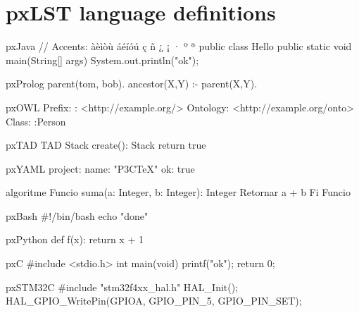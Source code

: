 \documentclass{article}
\begin{document}
\section*{pxLST language definitions}

\begin{pxCode}{pxJava}
// Accents: àèìòù áéíóú ç ñ ¿ ¡ · º ª
public class Hello { public static void main(String[] args) { System.out.println("ok"); } }
\end{pxCode}

\begin{pxCode}{pxProlog}
parent(tom, bob).
ancestor(X,Y) :- parent(X,Y).
\end{pxCode}

\begin{pxCode}{pxOWL}
Prefix: : <http://example.org/>
Ontology: <http://example.org/onto>
Class: :Person
\end{pxCode}

\begin{pxCode}{pxTAD}
TAD Stack
create(): Stack
return true
\end{pxCode}

\begin{pxCode}{pxYAML}
project:
  name: "P3CTeX"
  ok: true
\end{pxCode}

\begin{pxCode}{algoritme}
Funcio suma(a: Integer, b: Integer): Integer
  Retornar a + b
Fi Funcio
\end{pxCode}

\begin{pxCode}{pxBash}
#!/bin/bash
echo "done"
\end{pxCode}

\begin{pxCode}{pxPython}
def f(x):
    return x + 1
\end{pxCode}

\begin{pxCode}{pxC}
#include <stdio.h>
int main(void){ printf("ok\n"); return 0; }
\end{pxCode}

\begin{pxCode}{pxSTM32C}
#include "stm32f4xx_hal.h"
HAL_Init();
HAL_GPIO_WritePin(GPIOA, GPIO_PIN_5, GPIO_PIN_SET);
\end{pxCode}
\end{document}
